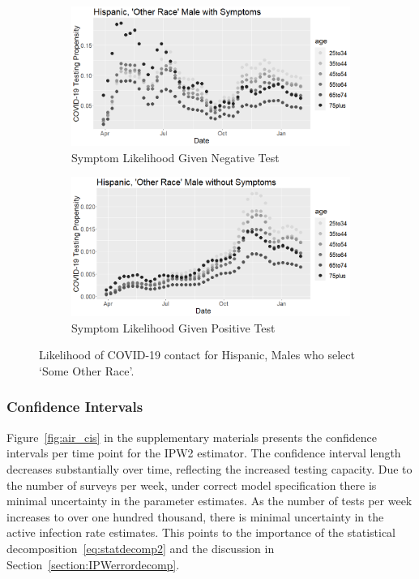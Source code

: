 \documentclass[12pt]{amsart}
\numberwithin{equation}{section}
\theoremstyle{plain}
\begin{document}
\begin{figure}[!th]
\centering
\begin{subfigure}{.5\textwidth}
 \centering
 \includegraphics[width=.9\linewidth]{../figs/tvprop_alt_fig1_supp3.png}
 \caption{Symptom Likelihood Given Negative Test}
\end{subfigure}%
\begin{subfigure}{.5\textwidth}
 \centering
\includegraphics[width=.9\linewidth]{../figs/tvprop_alt_fig2_supp3.png}
 \caption{Symptom Likelihood Given Positive Test}
\end{subfigure}
\caption{Likelihood of COVID-19 contact for Hispanic, Males who select `Some Other Race'.}
\label{fig:h-other-male}
\end{figure}



\newpage
\subsubsection{Confidence Intervals}


Figure~\ref{fig:air_cis} in the supplementary materials presents the confidence intervals per time point for the IPW2 estimator.  The confidence interval length decreases substantially over time, reflecting the increased testing capacity.  Due to the number of surveys per week, under correct model specification there is minimal uncertainty in the parameter estimates.  As the number of tests per week increases to over one hundred thousand, there is minimal uncertainty in the active infection rate estimates. This points to the importance of the statistical decomposition~\eqref{eq:statdecomp2} and the discussion in Section~\ref{section:IPWerrordecomp}.
\end{document}
